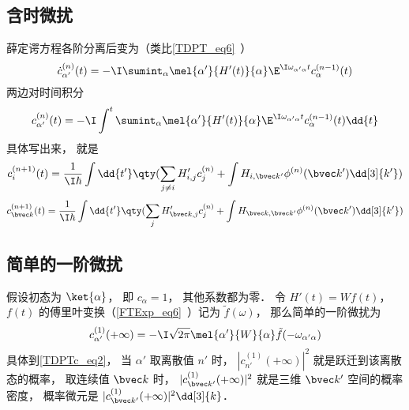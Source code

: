 \subsection{含时微扰}
薛定谔方程各阶分离后变为（类比\autoref{TDPT_eq6}~）
\begin{equation}
\dot c_{\alpha'}^{(n)}(t) = -\I \sumint_\alpha \mel{\alpha'}{H'(t)}{\alpha} \E^{\I \omega_{\alpha'\alpha} t} c_{\alpha}^{(n-1)}(t)
\end{equation}
两边对时间积分
\begin{equation}
c_{\alpha'}^{(n)}(t) = -\I \int^t \sumint_\alpha \mel{\alpha'}{H'(t)}{\alpha} \E^{\I \omega_{\alpha'\alpha} t} c_{\alpha}^{(n-1)}(t) \dd{t}
\end{equation}
具体写出来， 就是
\begin{equation}
c_i^{(n + 1)}(t) = \frac{1}{\I\hbar} \int \dd{t'} \qty(\sum_{j \ne i} H'_{i,j} c_j^{(n)} + \int H_{i,\bvec k'} \phi ^{(n)}(\bvec k') \dd[3]{k'} )
\end{equation}
\begin{equation}
c^{(n+1)}_{\bvec k}(t) = \frac{1}{\I\hbar} \int \dd{t'} \qty(\sum_j H'_{\bvec k,j} c_j^{(n)} + \int H_{\bvec k,\bvec k'} \phi ^{(n)}(\bvec k') \dd[3]{k'})
\end{equation}

\subsection{简单的一阶微扰}
假设初态为 $\ket{\alpha}$， 即 $c_\alpha = 1$， 其他系数都为零． 令 $H'(t) = W f(t)$， $f(t)$ 的傅里叶变换（\autoref{FTExp_eq6}~）记为 $\tilde f(\omega)$， 那么简单的一阶微扰为
\begin{equation}\label{TDPTc_eq1}
c_{\alpha'}^{(1)}(+\infty) = -\I\sqrt{2\pi} \mel{\alpha'}{W}{\alpha} \tilde f(-\omega_{\alpha'\alpha})
\end{equation}
具体到\autoref{TDPTc_eq2}， 当 $\alpha'$ 取离散值 $n'$ 时， $|c_{n'}^{(1)}(+\infty)|^2$ 就是跃迁到该离散态的概率， 取连续值 $\bvec k$ 时， $|c_{\bvec k'}^{(1)}(+\infty)|^2$ 就是三维 $\bvec k'$ 空间的概率密度， 概率微元是 $|c_{\bvec k'}^{(1)}(+\infty)|^2\dd[3]{k}$．

